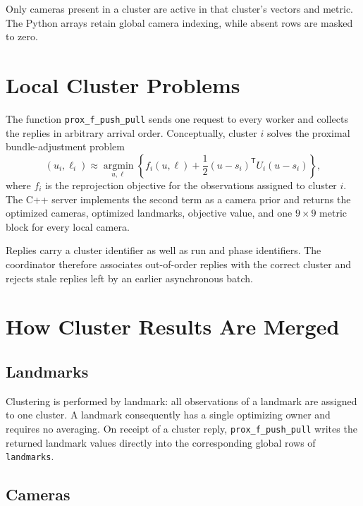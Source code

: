 \documentclass[11pt]{article}
\begin{document}
Only cameras present in a cluster are active in that cluster's vectors and
metric.  The Python arrays retain global camera indexing, while absent rows
are masked to zero.

\section{Local Cluster Problems}

The function \verb|prox_f_push_pull| sends one request to every worker and
collects the replies in arbitrary arrival order.  Conceptually, cluster $i$
solves the proximal bundle-adjustment problem
\begin{equation}
  (u_i,\ell_i)
  \approx
  \underset{u,\ell}{\operatorname{argmin}}
  \left\{
    f_i(u,\ell)
    + \frac{1}{2}(u-s_i)^{\mathsf T}U_i(u-s_i)
  \right\},
  \label{eq:local-prox}
\end{equation}
where $f_i$ is the reprojection objective for the observations assigned to
cluster $i$.  The C++ server implements the second term as a camera prior and
returns the optimized cameras, optimized landmarks, objective value, and one
$9\times9$ metric block for every local camera.

Replies carry a cluster identifier as well as run and phase identifiers.  The
coordinator therefore associates out-of-order replies with the correct
cluster and rejects stale replies left by an earlier asynchronous batch.

\section{How Cluster Results Are Merged}

\subsection{Landmarks}

Clustering is performed by landmark: all observations of a landmark are
assigned to one cluster.  A landmark consequently has a single optimizing
owner and requires no averaging.  On receipt of a cluster reply,
\verb|prox_f_push_pull| writes the returned landmark values directly into the
corresponding global rows of \verb|landmarks|.

\subsection{Cameras}
\end{document}
